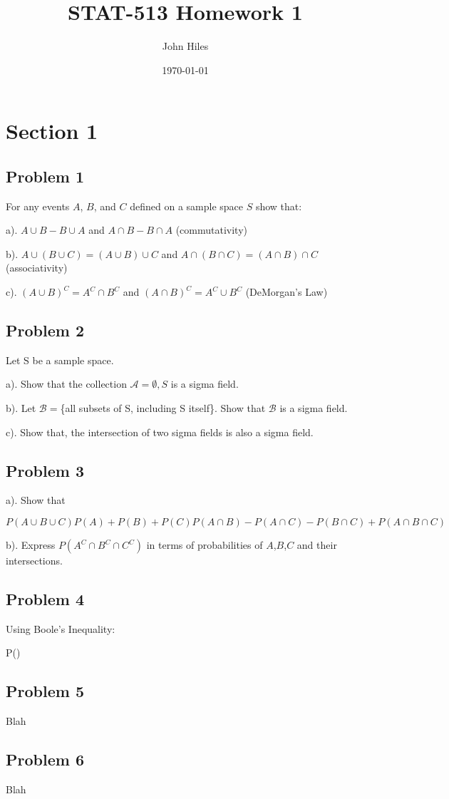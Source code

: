 \documentclass{article}
\title{STAT-513 Homework 1}
\author{John Hiles}
\date\today
\begin{document}
\maketitle %

\section*{Section 1}

\subsection*{Problem 1}
For any events $A$, $B$, and $C$ defined on a sample space $S$ show that:

a). $A\cup B - B\cup A$ and $A\cap B-B\cap A$ (commutativity)

b). $A\cup(B\cup C) = (A\cup B)\cup C$ and $A\cap(B\cap C) = (A\cap B)\cap C$ (associativity)

c). $(A\cup B)^{C} = A^{C}\cap B^{C}$ and $(A\cap B)^{C} = A^{C} \cup B^{C}$ (DeMorgan's Law)


\clearpage %

\subsection*{Problem 2}
Let S be a sample space.

a). Show that the collection $\mathcal{A} = {\emptyset,S}$ is a sigma field.

b). Let $\mathcal{B} = $\{all subsets of S, including S itself\}. Show that $\mathcal{B}$ is a sigma field.

c). Show that, the intersection of two sigma fields is also a sigma field.
\clearpage %

\subsection*{Problem 3}
a). Show that

$P(A\cup B\cup C) P(A) + P(B) + P(C) P(A\cap B) - P(A\cap C) - P(B\cap C) + P(A\cap B \cap C)$

b). Express $P(A^{C}\cap B^{C} \cap C^{C})$ in terms of probabilities of $A$,$B$,$C$ and their intersections.

\subsection*{Problem 4}
Using Boole's Inequality:

P()
\subsection*{Problem 5}
Blah
\subsection*{Problem 6}
Blah
\end{document}
